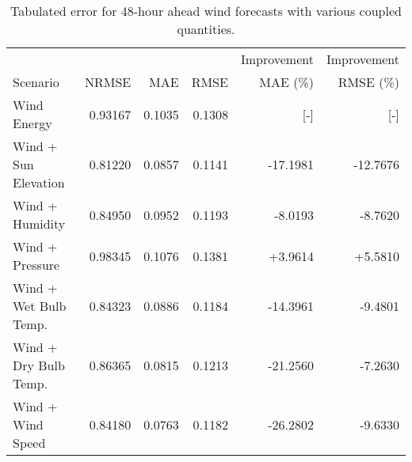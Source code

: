 \begin{table*}[h]
  \centering
  \caption{Tabulated error for 48-hour ahead wind forecasts with various coupled quantities.}
  \label{tab:wind48}
  \begin{tabular}{lrrrrr}
    \hline
    & & & & Improvement & Improvement \\
    Scenario &NRMSE & MAE & RMSE & MAE (\%) & RMSE (\%)\\
    \hline
    Wind Energy & 0.93167 & 0.1035 & 0.1308 & [-] & [-] \\
    Wind + Sun Elevation & 0.81220 & 0.0857 & 0.1141 & -17.1981 & -12.7676 \\
    Wind + Humidity & 0.84950 & 0.0952 & 0.1193 & -8.0193 & -8.7620 \\
    Wind + Pressure & 0.98345 & 0.1076 & 0.1381 & +3.9614 & +5.5810 \\
    Wind + Wet Bulb Temp. & 0.84323 & 0.0886 & 0.1184 & -14.3961 & -9.4801 \\
    Wind + Dry Bulb Temp. & 0.86365 & 0.0815 & 0.1213 & -21.2560 & -7.2630 \\
    Wind + Wind Speed & 0.84180 & 0.0763 & 0.1182 & -26.2802 & -9.6330 \\
    \hline
  \end{tabular}
\end{table*}
\FloatBarrier

